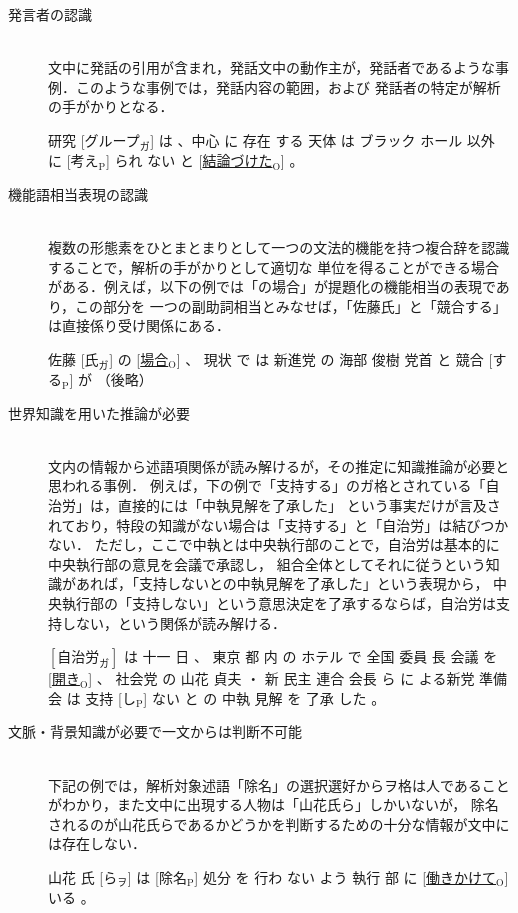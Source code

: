 \documentclass[japanese]{jnlp_1.4}
\begin{document}
\begin{description}
 \item[発言者の認識]\mbox{}\\
文中に発話の引用が含まれ，発話文中の動作主が，発話者であるような事例．このような事例では，発話内容の範囲，および
発話者の特定が解析の手がかりとなる．
\begin{screen}
研究 [グループ$_\text{ガ}$] は 、中心 に 存在 する 天体 は ブラック ホール 以外 に [考え$_\mathrm{P}$] られ ない と [\ul{結論づけた}$_\mathrm{O}$] 。
\end{screen}

 \item[機能語相当表現の認識]\mbox{}\\
 複数の形態素をひとまとまりとして一つの文法的機能を持つ複合辞を認識することで，解析の手がかりとして適切な
 単位を得ることができる場合がある．例えば，以下の例では「の場合」が提題化の機能相当の表現であり，この部分を
 一つの副助詞相当とみなせば，「佐藤氏」と「競合する」は直接係り受け関係にある．
\begin{screen}
佐藤 [氏$_\text{ガ}$] の [\ul{場合}$_\mathrm{O}$] 、 現状 で は 新進党 の 海部 俊樹 党首 と 競合 [する$_\mathrm{P}$] が （後略）
\end{screen}

 \item[世界知識を用いた推論が必要]\mbox{}\\
 文内の情報から述語項関係が読み解けるが，その推定に知識推論が必要と思われる事例．
 例えば，下の例で「支持する」のガ格とされている「自治労」は，直接的には「中執見解を了承した」
 という事実だけが言及されており，特段の知識がない場合は「支持する」と「自治労」は結びつかない．
 ただし，ここで中執とは中央執行部のことで，自治労は基本的に中央執行部の意見を会議で承認し，
 組合全体としてそれに従うという知識があれば，「支持しないとの中執見解を了承した」という表現から，
 中央執行部の「支持しない」という意思決定を了承するならば，自治労は支持しない，という関係が読み解ける．

\begin{screen}
$[自治労_\text{ガ}]$ は 十一 日 、 東京 都 内 の ホテル で 全国 委員 長 会議 を [\ul{開き}$_\mathrm{O}$] 、 社会党 の 山花 貞夫 ・ 新 民主 連合 会長 ら に よる新党 準備 会 は 支持 [し$_\mathrm{P}$] ない と の 中執 見解 を 了承 した 。
\end{screen}

 \item[文脈・背景知識が必要で一文からは判断不可能]\mbox{}\\
 下記の例では，解析対象述語「除名」の選択選好からヲ格は人であることがわかり，また文中に出現する人物は「山花氏ら」しかいないが，
 除名されるのが山花氏らであるかどうかを判断するための十分な情報が文中には存在しない．
\begin{screen}
山花 氏 [ら$_\text{ヲ}$] は [除名$_\mathrm{P}$] 処分 を 行わ ない よう 執行 部 に [\ul{働きかけて}$_\mathrm{O}$] いる 。
\end{screen}
\end{description}
\end{document}
